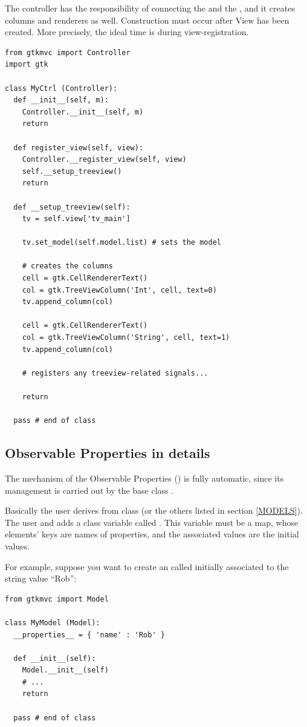 The controller has the responsibility of connecting the
 and the , and it creates
columns and renderers as well. Construction must occur after View has
been created. More precisely, the ideal time is during
view-registration.

{ \codesize 
\begin{verbatim}
from gtkmvc import Controller
import gtk

class MyCtrl (Controller):
  def __init__(self, m):
    Controller.__init__(self, m)
    return

  def register_view(self, view):
    Controller.__register_view(self, view)
    self.__setup_treeview()
    return

  def __setup_treeview(self):
    tv = self.view['tv_main']
    
    tv.set_model(self.model.list) # sets the model

    # creates the columns
    cell = gtk.CellRendererText()
    col = gtk.TreeViewColumn('Int', cell, text=0)
    tv.append_column(col)

    cell = gtk.CellRendererText()
    col = gtk.TreeViewColumn('String', cell, text=1)
    tv.append_column(col)

    # registers any treeview-related signals...

    return

  pass # end of class 
\end{verbatim}
}



\subsection{\label{OPD}Observable Properties in details}
The mechanism of the Observable Properties (\OP) is fully automatic,
since its management is carried out by the base class
.

Basically the user derives from class  (or the others
listed in section \ref{MODELS}). The user and adds a class variable
called \OPvar. This variable must be a map, whose elements' keys are
names of properties, and the associated values are the initial values.

For example, suppose you want to create an \OP called  
initially associated to the string value ``Rob'':

{ \codesize 
\begin{verbatim} 
from gtkmvc import Model

class MyModel (Model):
  __properties__ = { 'name' : 'Rob' }

  def __init__(self):
    Model.__init__(self)
    # ...
    return

  pass # end of class
\end{verbatim}
}

